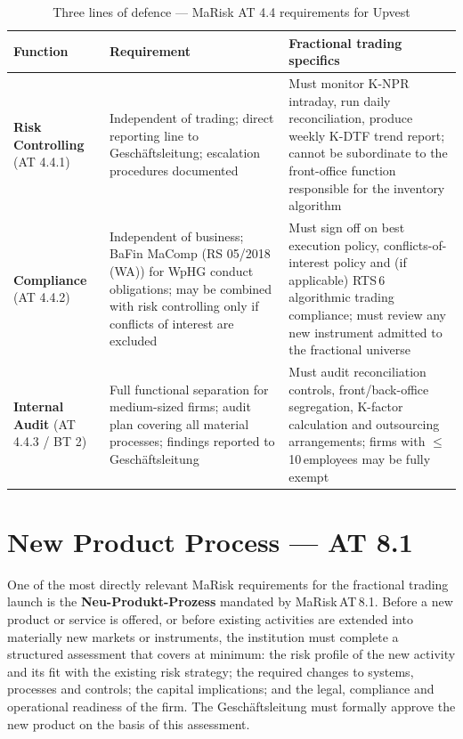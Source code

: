 \documentclass[12pt,a4paper]{report}
\begin{document}
\begin{table}[H]
\caption{Three lines of defence --- MaRisk AT 4.4 requirements for Upvest}
\label{tab:3lod}
\small
\begin{tabularx}{\textwidth}{@{}L{2.8cm}L{4.2cm}X@{}}
\toprule
\textbf{Function} & \textbf{Requirement} & \textbf{Fractional trading specifics} \\
\midrule
\textbf{Risk Controlling} (AT 4.4.1) &
  Independent of trading; direct reporting line to Gesch{\"a}ftsleitung;
  escalation procedures documented &
  Must monitor K-NPR intraday, run daily reconciliation, produce weekly
  K-DTF trend report; cannot be subordinate to the front-office function
  responsible for the inventory algorithm \\[5pt]
\textbf{Compliance} (AT 4.4.2) &
  Independent of business; BaFin MaComp (RS 05/2018 (WA)) for WpHG
  conduct obligations; may be combined with risk controlling only if
  conflicts of interest are excluded &
  Must sign off on best execution policy, conflicts-of-interest policy and
  (if applicable) RTS\,6 algorithmic trading compliance; must review any
  new instrument admitted to the fractional universe \\[5pt]
\textbf{Internal Audit} (AT 4.4.3 / BT 2) &
  Full functional separation for medium-sized firms; audit plan covering
  all material processes; findings reported to Gesch{\"a}ftsleitung &
  Must audit reconciliation controls, front/back-office segregation,
  K-factor calculation and outsourcing arrangements; firms with
  $\leq$\,10\,employees may be fully exempt \\
\bottomrule
\end{tabularx}
\end{table}

\section{New Product Process --- AT 8.1}
\label{sec:newproduct}

One of the most directly relevant MaRisk requirements for the fractional trading
launch is the \textbf{Neu-Produkt-Prozess} mandated by MaRisk\,AT\,8.1. Before
a new product or service is offered, or before existing activities are extended
into materially new markets or instruments, the institution must complete a
structured assessment that covers at minimum: the risk profile of the new
activity and its fit with the existing risk strategy; the required changes to
systems, processes and controls; the capital implications; and the legal,
compliance and operational readiness of the firm. The Gesch{\"a}ftsleitung must
formally approve the new product on the basis of this assessment.
\end{document}
